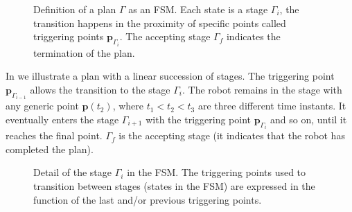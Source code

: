 \begin{figure}[h!]
  \center
  \caption[Definition of a plan]{Definition of a plan $\Gamma$ as an FSM. Each state is a stage $\Gamma_i$, the transition happens in the proximity of specific points called triggering points $\mathbf{p}_{\Gamma_i}$. The accepting stage $\Gamma_f$ indicates the termination of the plan.}
  \label{fig:state-machine}
\end{figure}
In  we illustrate a plan with a linear succession of stages. The triggering point $\mathbf{p}_{\Gamma_{i-1}}$ allows the transition to the stage $\Gamma_i$. The robot remains in the stage with any generic point $\mathbf{p}(t_2)$, where $t_1<t_2<t_3$ are three different time instants. It eventually enters the stage $\Gamma_{i+1}$ with the triggering point $\mathbf{p}_{\Gamma_i}$ and so on, until it reaches the final point. $\Gamma_f$ is the accepting stage (it indicates that the robot has completed the plan).
\begin{figure}[h!]
  \center
  \caption[Detail of a stage in the FSM]{Detail of the stage $\Gamma_i$ in the FSM. The triggering points used to transition between stages (states in the FSM) are expressed in the function of the last and/or previous triggering points.}
  \label{fig:state-machine2}
\end{figure}
